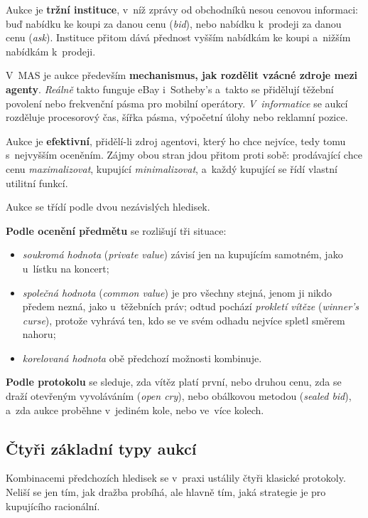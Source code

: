 \documentclass[11pt,a4paper]{article}
\theoremstyle{definition}
\begin{document}
\begin{defbox}[Aukce]
Aukce je \textbf{tržní instituce}, v~níž zprávy od obchodníků nesou cenovou informaci: buď
nabídku ke koupi za danou cenu (\emph{bid}), nebo nabídku k~prodeji za danou cenu (\emph{ask}).
Instituce přitom dává přednost vyšším nabídkám ke koupi a~nižším nabídkám k~prodeji.

V~MAS je aukce především \textbf{mechanismus, jak rozdělit vzácné zdroje mezi agenty}.
\emph{Reálně} takto funguje eBay i~Sotheby's a~takto se přidělují těžební povolení nebo
frekvenční pásma pro mobilní operátory. \emph{V~informatice} se aukcí rozděluje procesorový čas,
šířka pásma, výpočetní úlohy nebo reklamní pozice.

Aukce je \textbf{efektivní}, přidělí-li zdroj agentovi, který ho chce nejvíce, tedy tomu
s~nejvyšším oceněním. Zájmy obou stran jdou přitom proti sobě: prodávající chce cenu
\emph{maximalizovat}, kupující \emph{minimalizovat}, a~každý kupující se řídí vlastní
utilitní funkcí.
\end{defbox}

\begin{defbox}
Aukce se třídí podle dvou nezávislých hledisek.

\textbf{Podle ocenění předmětu} se rozlišují tři situace:
\begin{itemize}
\item \emph{soukromá hodnota} (\emph{private value}) závisí jen na kupujícím samotném, jako
  u~lístku na koncert;
\item \emph{společná hodnota} (\emph{common value}) je pro všechny stejná, jenom ji nikdo předem
  nezná, jako u~těžebních práv; odtud pochází \emph{prokletí vítěze} (\emph{winner's curse}),
  protože vyhrává ten, kdo se ve svém odhadu nejvíce spletl směrem nahoru;
\item \emph{korelovaná hodnota} obě předchozí možnosti kombinuje.
\end{itemize}
\textbf{Podle protokolu} se sleduje, zda vítěz platí první, nebo druhou cenu, zda se draží
otevřeným vyvoláváním (\emph{open cry}), nebo obálkovou metodou (\emph{sealed bid}), a~zda
aukce proběhne v~jediném kole, nebo ve~více kolech.
\end{defbox}
\subsection{Čtyři základní typy aukcí}

Kombinacemi předchozích hledisek se v~praxi ustálily čtyři klasické protokoly. Neliší se jen
tím, jak dražba probíhá, ale hlavně tím, jaká strategie je pro kupujícího racionální.
\end{document}

